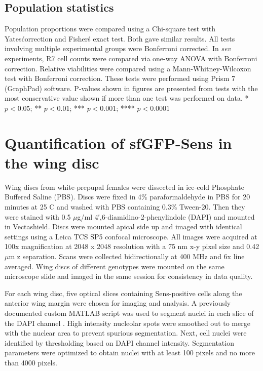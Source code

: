 \subsection{Population statistics}

Population proportions were compared using a Chi-square test with Yates\' correction and Fisher\'s exact test. Both gave similar results. All tests involving multiple experimental groups were Bonferroni corrected. In \textit{sev} experiments, R7 cell counts were compared via one-way ANOVA with Bonferroni correction. Relative viabilities were compared using a Mann-Whitney-Wilcoxon test with Bonferroni correction. These tests were performed using Prism 7 (GraphPad) software. P-values shown in figures are presented from tests with the most conservative value shown if more than one test was performed on data. * $p<0.05$; ** $p<0.01$; *** $p<0.001$; **** $p<0.0001$

\section{Quantification of sfGFP-Sens in the wing disc}
\label{appendix:metabolism:measurements:sens}

Wing discs from white-prepupal females were dissected in ice-cold Phosphate Buffered Saline (PBS). Discs were fixed in 4\% paraformaldehyde in PBS for 20 minutes at 25 \textdegree{}C and washed with PBS containing 0.3\% Tween-20. Then they were stained with 0.5 $\mu$g/ml 4′,6-diamidino-2-phenylindole (DAPI) and mounted in Vectashield. Discs were mounted apical side up and imaged with identical settings using a Leica TCS SP5 confocal microscope. All images were acquired at 100x magnification at 2048 x 2048 resolution with a 75 nm x-y pixel size and 0.42 $\mu$m z separation. Scans were collected bidirectionally at 400 MHz and 6x line averaged. Wing discs of different genotypes were mounted on the same microscope slide and imaged in the same session for consistency in data quality.

For each wing disc, five optical slices containing Sens-positive cells along the anterior wing margin were chosen for imaging and analysis. A previously documented custom MATLAB script was used to segment nuclei in each slice of the DAPI channel \cite{Pelaez2015a}. High intensity nucleolar spots were smoothed out to merge with the nuclear area to prevent spurious segmentation. Next, cell nuclei were identified by thresholding based on DAPI channel intensity. Segmentation parameters were optimized to obtain nuclei with at least 100 pixels and no more than 4000 pixels.

